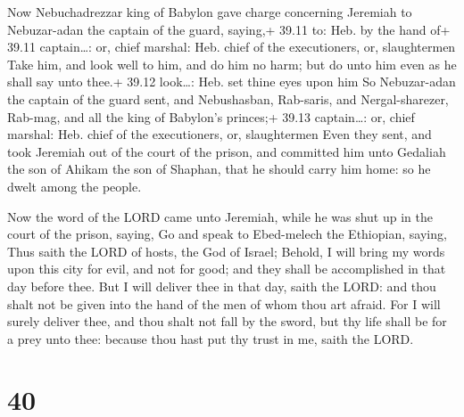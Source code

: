  Now Nebuchadrezzar king of Babylon gave charge
concerning Jeremiah to Nebuzar-adan the captain of the guard, saying,+
39.11 to: Heb. by the hand of+ 39.11 captain\ldots: or, chief marshal:
Heb. chief of the executioners, or, slaughtermen  Take him,
and look well to him, and do him no harm; but do unto him even as he
shall say unto thee.+ 39.12 look\ldots: Heb. set thine eyes upon him
 So Nebuzar-adan the captain of the guard sent, and
Nebushasban, Rab-saris, and Nergal-sharezer, Rab-mag, and all the king
of Babylon's princes;+ 39.13 captain\ldots: or, chief marshal: Heb.
chief of the executioners, or, slaughtermen  Even they
sent, and took Jeremiah out of the court of the prison, and committed
him unto Gedaliah the son of Ahikam the son of Shaphan, that he should
carry him home: so he dwelt among the people.

 Now the word of the LORD came unto Jeremiah, while he
was shut up in the court of the prison, saying,  Go and
speak to Ebed-melech the Ethiopian, saying, Thus saith the LORD of
hosts, the God of Israel; Behold, I will bring my words upon this city
for evil, and not for good; and they shall be accomplished in that day
before thee.  But I will deliver thee in that day, saith
the LORD: and thou shalt not be given into the hand of the men of whom
thou art afraid.  For I will surely deliver thee, and thou
shalt not fall by the sword, but thy life shall be for a prey unto thee:
because thou hast put thy trust in me, saith the LORD.

\hypertarget{section-39}{%
\section{40}\label{section-39}}

